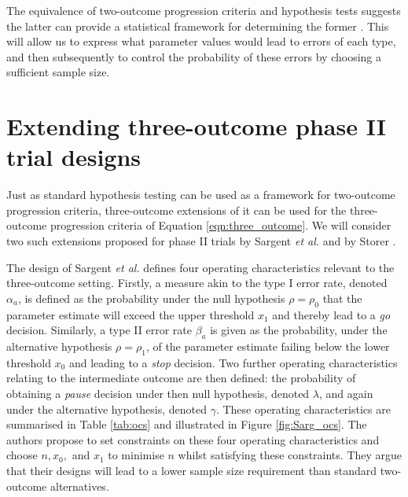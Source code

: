 \documentclass{bmcart}
\begin{document}
The equivalence of two-outcome progression criteria and hypothesis tests suggests the latter can provide a statistical framework for determining the former \cite{Lewis2021a}. This will allow us to express what parameter values would lead to errors of each type, and then subsequently to control the probability of these errors by choosing a sufficient sample size.

\section{Extending three-outcome phase II trial designs}\label{sec:review}

Just as standard hypothesis testing can be used as a framework for two-outcome progression criteria, three-outcome extensions of it can be used for the three-outcome progression criteria of Equation \ref{eqn:three_outcome}. We will consider two such extensions proposed for phase II trials by Sargent \emph{et al.} \cite{Sargent2001} and by Storer \cite{Storer1992}.

The design of Sargent \emph{et al.} defines four operating characteristics relevant to the three-outcome setting. Firstly, a measure akin to the type I error rate, denoted $\alpha_a$, is defined as the probability under the null hypothesis $\rho = \rho_0$ that the parameter estimate will exceed the upper threshold $x_1$ and thereby lead to a \emph{go} decision. Similarly, a type II error rate $\beta_a$ is given as the probability, under the alternative hypothesis $\rho = \rho_1$, of the parameter estimate failing below the lower threshold $x_0$ and leading to a \emph{stop} decision. Two further operating characteristics relating to the intermediate outcome are then defined: the probability of obtaining a \emph{pause} decision under then null hypothesis, denoted $\lambda$, and again under the alternative hypothesis, denoted $\gamma$. These operating characteristics are summarised in Table \ref{tab:ocs} and illustrated in Figure \ref{fig:Sarg_ocs}. The authors propose to set constraints on these four operating characteristics and choose $n, x_0,$ and $x_1$ to minimise $n$ whilst satisfying these constraints. They argue that their designs will lead to a lower sample size requirement than standard two-outcome alternatives.
\end{document}
